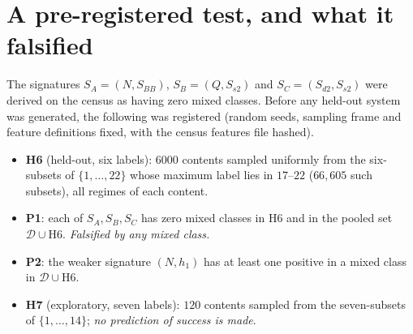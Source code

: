 \section{A pre-registered test, and what it falsified}\label{sec:prereg}
The signatures $S_A=(N,S_{BB})$, $S_B=(Q,S_{s2})$ and $S_C=(S_{d2},S_{s2})$ were derived on the census as having zero mixed classes. Before any held-out system was generated, the following was registered (random seeds, sampling frame and feature definitions fixed, with the census features file hashed).
\begin{itemize}[nosep]
\item \textbf{H6} (held-out, six labels): $6000$ contents sampled uniformly from the six-subsets of $\{1,\dots,22\}$ whose maximum label lies in $17$--$22$ ($66{,}605$ such subsets), all regimes of each content.
\item \textbf{P1}: each of $S_A,S_B,S_C$ has zero mixed classes in H6 and in the pooled set $\mathcal D\cup$H6. \emph{Falsified by any mixed class.}
\item \textbf{P2}: the weaker signature $(N,h_1)$ has at least one positive in a mixed class in $\mathcal D\cup$H6.
\item \textbf{H7} (exploratory, seven labels): $120$ contents sampled from the seven-subsets of $\{1,\dots,14\}$; \emph{no prediction of success is made}.
\end{itemize}
